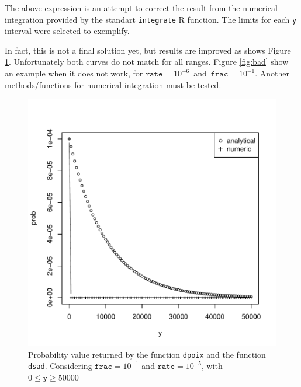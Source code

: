 \documentclass{article}
\newcommand{\code}[1]{\texttt{#1}}
\begin{document}
\begin{Schunk}
\end{Schunk}

The above expression is an attempt to correct the result from the numerical  integration provided by the standart \code{integrate} R function. The limits for each \code{y} interval were selected to exemplify.

In fact, this is not a final solution yet, but results are improved as shows Figure  \ref{fig:good}. Unfortunately both curves do not match for all ranges. Figure \ref{fig:bad} show an example when it does not work, for $\code{rate}=10^{-6}$\ and\ $\code{frac}=10^{-1}$. Another methods/functions for numerical integration must be tested.

\begin{figure}[ht]
  \begin{center}
\includegraphics{sads_logbook-012}
\end{center}
\caption{Probability value returned by the function \code{dpoix} and the function \code{dsad}. Considering $\code{frac}=10^{-1}$ and $\code{rate}=10^{-5}$, with $0 \leq \code{y} \geq 50000$}
\label{fig:good}
\end{figure}
\end{document}
